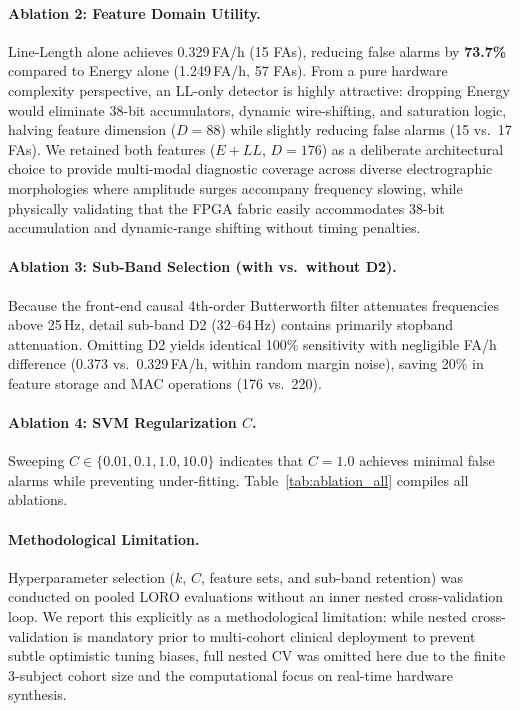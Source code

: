\documentclass[10pt,twocolumn,letterpaper]{article}
\begin{document}
\paragraph{Ablation 2: Feature Domain Utility.} Line-Length alone achieves 0.329\,FA/h (15 FAs), reducing false alarms by \textbf{73.7\%} compared to Energy alone (1.249\,FA/h, 57 FAs). From a pure hardware complexity perspective, an LL-only detector is highly attractive: dropping Energy would eliminate 38-bit accumulators, dynamic wire-shifting, and saturation logic, halving feature dimension ($D=88$) while slightly reducing false alarms (15 vs.\ 17 FAs). We retained both features ($E+LL$, $D=176$) as a deliberate architectural choice to provide multi-modal diagnostic coverage across diverse electrographic morphologies where amplitude surges accompany frequency slowing, while physically validating that the FPGA fabric easily accommodates 38-bit accumulation and dynamic-range shifting without timing penalties.

\paragraph{Ablation 3: Sub-Band Selection (with vs.\ without D2).} Because the front-end causal 4th-order Butterworth filter attenuates frequencies above 25\,Hz, detail sub-band D2 (32--64\,Hz) contains primarily stopband attenuation. Omitting D2 yields identical 100\% sensitivity with negligible FA/h difference (0.373 vs.\ 0.329\,FA/h, within random margin noise), saving 20\% in feature storage and MAC operations (176 vs.\ 220).

\paragraph{Ablation 4: SVM Regularization $C$.} Sweeping $C \in \{0.01, 0.1, 1.0, 10.0\}$ indicates that $C=1.0$ achieves minimal false alarms while preventing under-fitting. Table~\ref{tab:ablation_all} compiles all ablations.

\paragraph{Methodological Limitation.} Hyperparameter selection ($k$, $C$, feature sets, and sub-band retention) was conducted on pooled LORO evaluations without an inner nested cross-validation loop. We report this explicitly as a methodological limitation: while nested cross-validation is mandatory prior to multi-cohort clinical deployment to prevent subtle optimistic tuning biases, full nested CV was omitted here due to the finite 3-subject cohort size and the computational focus on real-time hardware synthesis.
\end{document}
